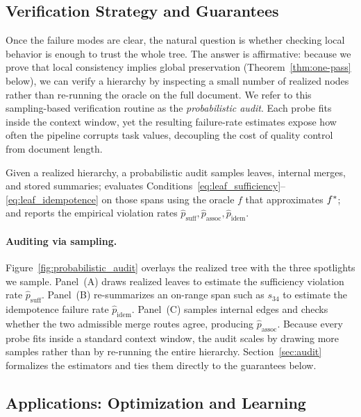 \subsection{Verification Strategy and Guarantees}

Once the failure modes are clear, the natural question is whether checking local behavior is enough to trust the whole tree. The answer is affirmative: because we prove that local consistency implies global preservation (Theorem~\ref{thm:one-pass} below), we can verify a hierarchy by inspecting a small number of realized nodes rather than re-running the oracle on the full document. We refer to this sampling-based verification routine as the \emph{probabilistic audit}. Each probe fits inside the context window, yet the resulting failure-rate estimates expose how often the pipeline corrupts task values, decoupling the cost of quality control from document length.

\begin{definition}\label{def:prob-audit}
Given a realized hierarchy, a probabilistic audit samples leaves, internal merges, and stored summaries; evaluates Conditions~\eqref{eq:leaf_sufficiency}--\eqref{eq:leaf_idempotence} on those spans using the oracle $f$ that approximates $f^{\ast}$; and reports the empirical violation rates $\hat{p}_{\text{suff}}, \hat{p}_{\text{assoc}}, \hat{p}_{\text{idem}}$.
\end{definition}

\paragraph{Auditing via sampling.}
Figure~\ref{fig:probabilistic_audit} overlays the realized tree with the three spotlights we sample. Panel~(A) draws realized leaves to estimate the sufficiency violation rate $\hat{p}_{\text{suff}}$. Panel~(B) re-summarizes an on-range span such as $s_{34}$ to estimate the idempotence failure rate $\hat{p}_{\text{idem}}$. Panel~(C) samples internal edges and checks whether the two admissible merge routes agree, producing $\hat{p}_{\text{assoc}}$. Because every probe fits inside a standard context window, the audit scales by drawing more samples rather than by re-running the entire hierarchy. Section~\ref{sec:audit} formalizes the estimators and ties them directly to the guarantees below.

\subsection{Applications: Optimization and Learning}

